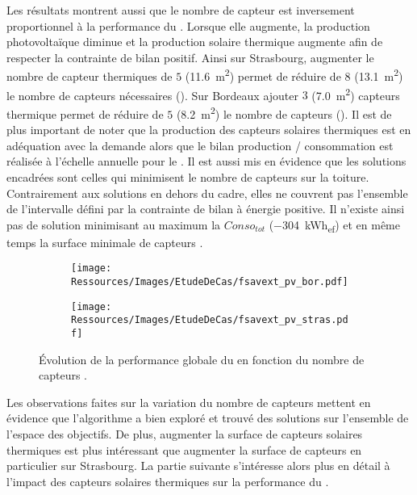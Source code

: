 Les résultats montrent aussi que le nombre de capteur  est inversement
proportionnel à la performance du . Lorsque elle augmente, la production
photovoltaïque diminue et la production solaire thermique augmente afin de respecter la
contrainte de bilan positif. Ainsi sur Strasbourg, augmenter le nombre de capteur
thermiques de $5$ (\SI{11.6}{m^{2}}) permet de réduire de $8$ (\SI{13.1}{m^{2}}) le nombre de capteurs  nécessaires
(). Sur Bordeaux ajouter $3$ (\SI{7.0}{m^{2}}) capteurs thermique permet
de réduire de $5$ (\SI{8.2}{m^{2}}) le nombre de capteurs  (). Il
est de plus important de noter que la production des capteurs solaires thermiques est en adéquation
avec la demande alors que le bilan production / consommation est réalisée à l’échelle annuelle
pour le . Il est aussi mis en évidence que les solutions encadrées sont celles qui
minimisent le nombre de capteurs  sur la toiture. Contrairement aux solutions en
dehors du cadre, elles ne couvrent pas l’ensemble de l’intervalle défini par la contrainte
de bilan à énergie positive. Il n’existe ainsi pas de solution minimisant au maximum la
$Conso_{tot}$ (\SI{-304}{kWh_{ef}}) et en même temps la surface minimale de capteurs
.

\begin{figure}
    \centering
    \begin{subfigure}[b]{0.48\textwidth}
        \centering
        \texttt{[image: Ressources/Images/EtudeDeCas/fsavext\_pv\_bor.pdf]}
        \caption{}
        \label{fig:fsav_pv_bor}
    \end{subfigure}
    \quad
    \begin{subfigure}[b]{0.48\textwidth}
        \centering
        \texttt{[image: Ressources/Images/EtudeDeCas/fsavext\_pv\_stras.pdf]}
        \caption{}
        \label{fig:fsav_pv_stras}
    \end{subfigure}
    \caption[Évolution de la performance globale du  en fonction du nombre de capteurs ]
             {Évolution de la performance globale du  en fonction du nombre de capteurs .}
    \label{fig:fsav_pv_bor_stras}
\end{figure}

Les observations faites sur la variation du nombre de capteurs 
mettent en évidence que l’algorithme a bien exploré et trouvé des solutions sur
l’ensemble de l’espace des objectifs. De plus, augmenter la surface de capteurs
solaires thermiques est plus intéressant que augmenter la surface de capteurs 
en particulier sur Strasbourg. La partie suivante s’intéresse alors plus en détail
à l’impact des capteurs solaires thermiques sur la performance du .

